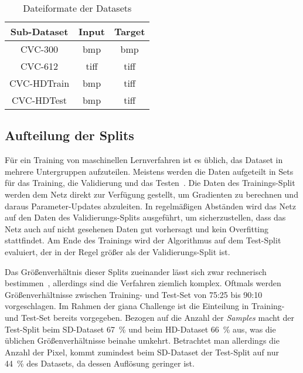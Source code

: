 \begin{table}
	\centering
	\caption{Dateiformate der Datasets}
	\label{tab:dataformats}
	\begin{tabular}{ccc} 
		\toprule
		Sub-Dataset & Input & Target \\ 
		\midrule
		CVC-300 & \gls{bmp} & \gls{bmp} \\
		CVC-612 & \gls{tiff} & \gls{tiff} \\
		CVC-HDTrain & \gls{bmp} & \gls{tiff} \\
		CVC-HDTest & \gls{bmp} & \gls{tiff} \\
		\bottomrule
	\end{tabular}
\end{table}



\subsection{Aufteilung der Splits}

Für ein Training von maschinellen Lernverfahren ist es üblich, das Dataset in mehrere Untergruppen aufzuteilen.
Meistens werden die Daten aufgeteilt in Sets für das Training, die Validierung und das Testen~\cite{Guyon.1997}.
Die Daten des Trainings-Split werden dem Netz direkt zur Verfügung gestellt, um Gradienten zu berechnen und daraus Parameter-Updates abzuleiten.
In regelmäßigen Abständen wird das Netz auf den Daten des Validierungs-Splits ausgeführt, um sicherzustellen, dass das Netz auch auf nicht gesehenen Daten gut vorhersagt und kein Overfitting stattfindet.
Am Ende des Trainings wird der Algorithmus auf dem Test-Split evaluiert, der in der Regel größer als der Validierungs-Split ist.

Das Größenverhältnis dieser Splits zueinander lässt sich zwar rechnerisch bestimmen~\cite{Guyon.1998,Guyon.1997}, allerdings sind die Verfahren ziemlich komplex.
Oftmals werden Größenverhältnisse zwischen Training- und Test-Set von 75:25 bis 90:10 vorgeschlagen.
Im Rahmen der \gls{giana} Challenge ist die Einteilung in Training- und Test-Set bereits vorgegeben.
Bezogen auf die Anzahl der \emph{Samples} macht der Test-Split beim SD-Dataset 67~\% und beim HD-Dataset 66~\% aus, was die üblichen Größenverhältnisse beinahe umkehrt.
Betrachtet man allerdings die Anzahl der Pixel, kommt zumindest beim SD-Dataset der Test-Split auf nur 44~\% des Datasets, da dessen Auflösung geringer ist.

